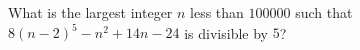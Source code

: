 What is the largest integer $n$ less than $100000$ such that $8(n-2)^5-n^2+14n-24$ is divisible by $5$?

